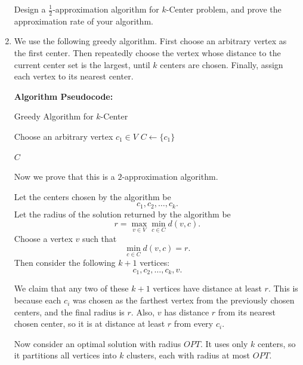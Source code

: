 \documentclass[12pt,a4paper]{article}
\makeatletter
\newtheorem*{solution}{Solution}
\theoremstyle{definition}
\renewenvironment{solution}[1][Solution] {\par\pushQED{\qed}\normalfont\topsep6\p@\@plus6\p@\relax\trivlist\item[\hskip\labelsep\bfseries#1\@addpunct{.}]\ignorespaces}{\popQED\endtrivlist\@endpefalse} \makeatother
\makeatother
\begin{document}
\begin{enumerate}
    Design a $\frac{1}{2}$-approximation algorithm for $k$-Center problem, and prove the approximation rate of your algorithm.

    \begin{solution}
    We use the following greedy algorithm. First choose an arbitrary vertex as the first center. Then repeatedly choose the vertex whose distance to the current center set is the largest, until \(k\) centers are chosen. Finally, assign each vertex to its nearest center.
    
    \textbf{Algorithm Pseudocode:}
    
    \begin{minipage}{\linewidth}
    \begin{algorithm}[H]
    \caption{Greedy Algorithm for \(k\)-Center}
    
    Choose an arbitrary vertex \(c_1\in V\)\;
    \(C\gets \{c_1\}\)\;
    
    
    \Return \(C\)\;
    \end{algorithm}
    \end{minipage}
    
    Now we prove that this is a \(2\)-approximation algorithm.
    
    Let the centers chosen by the algorithm be
    \[
    c_1,c_2,\ldots,c_k.
    \]
    Let the radius of the solution returned by the algorithm be
    \[
    r=\max_{v\in V}\min_{c\in C}d(v,c).
    \]
    Choose a vertex \(v\) such that
    \[
    \min_{c\in C}d(v,c)=r.
    \]
    Then consider the following \(k+1\) vertices:
    \[
    c_1,c_2,\ldots,c_k,v.
    \]
    
    We claim that any two of these \(k+1\) vertices have distance at least \(r\). This is because each \(c_i\) was chosen as the farthest vertex from the previously chosen centers, and the final radius is \(r\). Also, \(v\) has distance \(r\) from its nearest chosen center, so it is at distance at least \(r\) from every \(c_i\).
    
    Now consider an optimal solution with radius \(OPT\). It uses only \(k\) centers, so it partitions all vertices into \(k\) clusters, each with radius at most \(OPT\).
    

\end{solution}
\end{enumerate}
\end{document}
